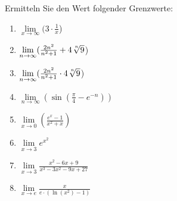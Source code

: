 \item Ermitteln Sie den Wert folgender Grenzwerte:

\begin{multicols}{2}
\begin{enumerate}
\item $\lim\limits_{x \to \infty} (3 \cdot \frac{1}{x}$)
\item $\lim\limits_{n \to \infty} (\frac{2n^2}{n^2+1} + 4\nroot{n}{9}$)
\item $\lim\limits_{n \to \infty} (\frac{2n^2}{n^2+1} \cdot 4\nroot{n}{9}$)
\item $\lim\limits_{n \to \infty} \left(\sin(\frac{\pi}{4}-e^{-n})\right)$
\item $\lim\limits_{x \to 0} (\frac{e^x-1}{x^2+x})$
\item $\lim\limits_{x \to 3} e^{x^2}$
\item $\lim\limits_{x \to 3} \frac{x^2-6x+9}{x^3-3x^2-9x+27}$
\item $\lim\limits_{x \to e} \frac{x}{e \cdot (\ln(x^2)-1)}$
\end{enumerate}
\end{multicols}

